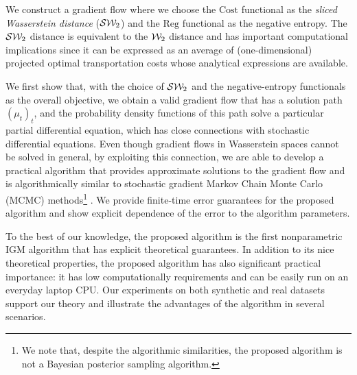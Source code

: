 We construct a gradient flow where we choose the $\mathrm{Cost}$ functional as the \textit{sliced Wasserstein distance} (${\cal S}{\cal W}_2$) \cite{bonneel2015sliced} and the $\mathrm{Reg}$ functional as the negative entropy. The ${\cal S}{\cal W}_2$ distance is equivalent to the ${\cal W}_2$ distance \cite{bonnotte2013unidimensional} and has important computational implications since it can be expressed as an average of (one-dimensional) projected optimal transportation costs whose analytical expressions are available.

We first show that, with the choice of ${\cal S}{\cal W}_2$ and the negative-entropy functionals as the overall objective, we obtain a valid gradient flow that has a solution path $(\mu_t)_t$, and the probability density functions of this path solve a particular partial differential equation, which has close connections with stochastic differential equations. Even though gradient flows in Wasserstein spaces cannot be solved in general, by exploiting this connection, we are able to develop a practical algorithm that provides approximate solutions to the gradient flow and is algorithmically similar to stochastic gradient Markov Chain Monte Carlo (MCMC) methods\footnote{We note that, despite the algorithmic similarities, the proposed algorithm is not a Bayesian posterior sampling algorithm.} \cite{WelTeh2011a,raginsky17a}. We provide finite-time error guarantees for the proposed algorithm and show explicit dependence of the error to the algorithm parameters.



To the best of our knowledge, the proposed algorithm is the first nonparametric IGM algorithm that has explicit theoretical guarantees. In addition to its nice theoretical properties, the proposed algorithm has also significant practical importance: it has low computationally requirements and can be easily run on an everyday laptop CPU.
Our experiments on both synthetic and real datasets support our theory and illustrate the advantages of the algorithm in several scenarios.







